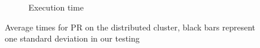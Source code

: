 \begin{figure}
\begin{subfigure}{0.32\textwidth}
		\caption{Execution time}
		\label{fig:distributedPR_exec}
	\end{subfigure}
	\hfil
	\caption{Average times for PR on the distributed cluster, black bars represent one standard deviation in our testing}
	\label{fig:distributedPR}
\end{figure}











